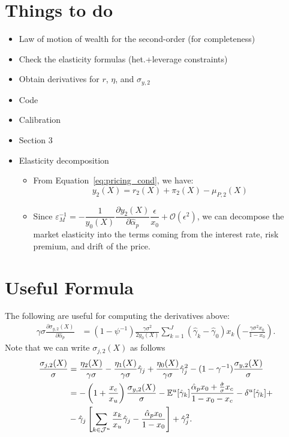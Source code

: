 \section{Things to do}
\begin{itemize}
	\item Law of motion of wealth for the second-order (for completeness)
	\item Check the elasticity formulas (het.+leverage constraints)
	\item Obtain derivatives for $r$, $\eta$, and $\sigma_{y,2}$
	\item Code
	\item Calibration
	\item Section 3
	\item Elasticity decomposition
	\begin{itemize}
		\item From Equation~\eqref{eq:pricing_cond}, we have:
		\begin{equation*}
		y_2(X) = r_2(X) + \pi_2(X) - \mu_{P,2}(X)
		\end{equation*}
		\item Since $ \varepsilon_M^{-1}=-\dfrac{1}{y_{0}(X)} \dfrac{\partial y_{2}(X)}{\partial \hat{\alpha}_{p}} \dfrac{\epsilon}{x_{0}}+\mathcal{O}\left(\epsilon^{2}\right)$, we can decompose the market elasticity into the terms coming from the interest rate, risk premium, and drift of the price.
	\end{itemize}      
\end{itemize}

\section{Useful Formula} The following are useful for computing the derivatives above:
\begin{align}
\gamma \sigma \frac{\partial \sigma_{y,2}(X)}{\partial \hat{\alpha}_p} &= \left(1-\psi^{-1}\right)\frac{\gamma\sigma^2}{2 y_{0}(X)} \sum_{k=1}^J \left( \hat{\gamma}_k - \hat{\gamma}_0  \right) x_k \left(- \frac{\gamma \sigma^2 x_0}{1-x_0} \right).
\end{align}
Note that we can write $\sigma_{j,2}(X)$ as follows
\begin{align}
\frac{\sigma_{j,2}(X)}{\sigma} &= \frac{\eta_2(X)}{\gamma \sigma} - \frac{\eta_1(X)}{\gamma\sigma}\hat{\gamma}_j + \frac{\eta_0(X)}{\gamma\sigma}\hat{\gamma}_j^2 - (1-\gamma^{-1}) \frac{\sigma_{y,2}(X)}{\sigma}\nonumber\\
&= -\left( 1 + \frac{ x_c}{x_u}\right)\frac{\sigma_{y,2}(X)}{\sigma}-\mathbb{E}^u[\hat{\gamma}_k] \frac{ \hat{\alpha}_p x_0+ \frac{\hat{\sigma}}{\sigma}x_c }{1-x_0-x_c} -\var^u[\hat{\gamma}_k] +\nonumber\\
& - \hat{\gamma}_j \left[\sum_{k\in\mathcal{J}^u} \frac{x_k}{x_u} \hat{\gamma}_j -\frac{\hat{\alpha}_p  x_0}{1-x_0}\right]+\hat{\gamma}_j^2.
\end{align}

